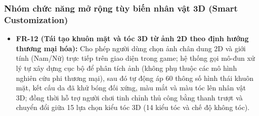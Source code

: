 \subsubsection{Nhóm chức năng mở rộng tùy biến nhân vật 3D (Smart Customization)}
\begin{itemize}
    \item \textbf{FR-12 (Tái tạo khuôn mặt và tóc 3D từ ảnh 2D theo định hướng thương mại hóa):} Cho phép người dùng chọn ảnh chân dung 2D và giới tính (Nam/Nữ) trực tiếp trên giao diện trong game; hệ thống gọi mô-đun xử lý tự xây dựng cục bộ để phân tích ảnh (không phụ thuộc các mô hình nghiên cứu phi thương mại), sau đó tự động áp $60$ thông số hình thái khuôn mặt, kết cấu da đã khử bóng đối xứng, màu mắt và màu tóc lên nhân vật 3D; đồng thời hỗ trợ người chơi tinh chỉnh thủ công bằng thanh trượt và chuyển đổi giữa 15 lựa chọn kiểu tóc 3D (14 kiểu tóc và chế độ không tóc).
\end{itemize}

